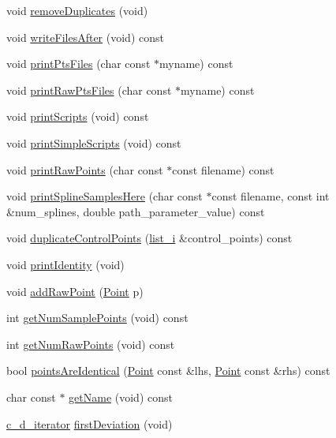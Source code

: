 \begin{CompactItemize}
void \hyperlink{classContour_0b7d66074d566108b50fd23e370e3503}{removeDuplicates} (void)
\item 
void \hyperlink{classContour_12541e0e0d4cc193cfba7e939f4b0ae4}{writeFilesAfter} (void) const 
\item 
void \hyperlink{classContour_f0e05e8412a7478801a879d8b18f2b54}{printPtsFiles} (char const $\ast$myname) const 
\item 
void \hyperlink{classContour_f0c59693fbb4d996a6211c46f6e6cf11}{printRawPtsFiles} (char const $\ast$myname) const 
\item 
void \hyperlink{classContour_d82d6b904ce3c2913cef47f197c30994}{printScripts} (void) const 
\item 
void \hyperlink{classContour_49b018412a5f71c9e53400b49a9be29d}{printSimpleScripts} (void) const 
\item 
void \hyperlink{classContour_54234b52ace49334cf33f55f4a990687}{printRawPoints} (char const $\ast$const filename) const 
\item 
void \hyperlink{classContour_99c3b3f32aeeabcf65dad7ba65e667cf}{printSplineSamplesHere} (char const $\ast$const filename, const int \&num\_\-splines, double path\_\-parameter\_\-value) const 
\item 
void \hyperlink{classContour_6d939fbc0872756248ff958d447b74af}{duplicateControlPoints} (\hyperlink{contour_8h_48cca362cb388dfdb3f8df5441d03717}{list\_\-i} \&control\_\-points) const 
\item 
void \hyperlink{classContour_4a50a35bbbcda623b7526ca38d81494c}{printIdentity} (void)
\item 
void \hyperlink{classContour_3feef63e061288c10d3d19788d44a2bc}{addRawPoint} (\hyperlink{classPoint}{Point} p)
\item 
int \hyperlink{classContour_7dca95e330dc1baf98ff5bc64279a0b4}{getNumSamplePoints} (void) const 
\item 
int \hyperlink{classContour_28922b2cf76490fd14ea7019aedd1235}{getNumRawPoints} (void) const 
\item 
bool \hyperlink{classContour_a29199e9ea18f0a4d58c94eca0cc62e3}{pointsAreIdentical} (\hyperlink{classPoint}{Point} const \&lhs, \hyperlink{classPoint}{Point} const \&rhs) const 
\item 
char const $\ast$ \hyperlink{classContour_0dbbcfa417bfde6a69069b2ac1376577}{getName} (void) const 
\item 
\hyperlink{parameter_8h_76617663fb8c2b14cf698a47a4d07926}{c\_\-d\_\-iterator} \hyperlink{classContour_dd1f35c151bb186952ca13ceba8d7e54}{firstDeviation} (void)

\end{CompactItemize}
